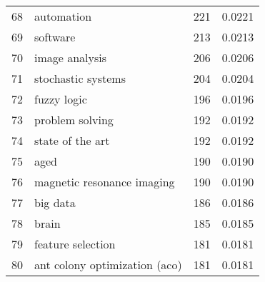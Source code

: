 \begin{tabular}{llrr}
68 &                               automation &         221 &      0.0221 \\
69 &                                 software &         213 &      0.0213 \\
70 &                           image analysis &         206 &      0.0206 \\
71 &                       stochastic systems &         204 &      0.0204 \\
72 &                              fuzzy logic &         196 &      0.0196 \\
73 &                          problem solving &         192 &      0.0192 \\
74 &                         state of the art &         192 &      0.0192 \\
75 &                                     aged &         190 &      0.0190 \\
76 &               magnetic resonance imaging &         190 &      0.0190 \\
77 &                                 big data &         186 &      0.0186 \\
78 &                                    brain &         185 &      0.0185 \\
79 &                        feature selection &         181 &      0.0181 \\
80 &            ant colony optimization (aco) &         181 &      0.0181 \\
\bottomrule
\end{tabular}

